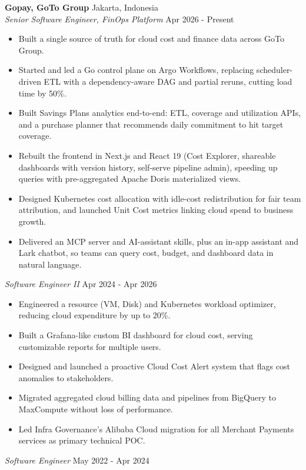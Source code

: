 \documentclass[a4paper]{article}
\begin{document}
\textbf{Gopay, GoTo Group} \hfill Jakarta, Indonesia\\
\textit{Senior Software Engineer, FinOps Platform} \hfill Apr 2026 - Present\\
\begin{itemize}
    \item Built a single source of truth for cloud cost and finance data across GoTo Group.
    \item Started and led a Go control plane on Argo Workflows, replacing scheduler-driven ETL with a dependency-aware DAG and partial reruns, cutting load time by 50\%.
    \item Built Savings Plans analytics end-to-end: ETL, coverage and utilization APIs, and a purchase planner that recommends daily commitment to hit target coverage.
    \item Rebuilt the frontend in Next.js and React 19 (Cost Explorer, shareable dashboards with version history, self-serve pipeline admin), speeding up queries with pre-aggregated Apache Doris materialized views.
    \item Designed Kubernetes cost allocation with idle-cost redistribution for fair team attribution, and launched Unit Cost metrics linking cloud spend to business growth.
    \item Delivered an MCP server and AI-assistant skills, plus an in-app assistant and Lark chatbot, so teams can query cost, budget, and dashboard data in natural language.
\end{itemize}
\textit{Software Engineer II} \hfill Apr 2024 - Apr 2026\\
\begin{itemize}
    \item Engineered a resource (VM, Disk) and Kubernetes workload optimizer, reducing cloud expenditure by up to 20\%.
    \item Built a Grafana-like custom BI dashboard for cloud cost, serving customizable reports for multiple users.
    \item Designed and launched a proactive Cloud Cost Alert system that flags cost anomalies to stakeholders.
    \item Migrated aggregated cloud billing data and pipelines from BigQuery to MaxCompute without loss of performance.
    \item Led Infra Governance's Alibaba Cloud migration for all Merchant Payments services as primary technical POC.
\end{itemize}
\textit{Software Engineer} \hfill May 2022 - Apr 2024\\
\end{document}
